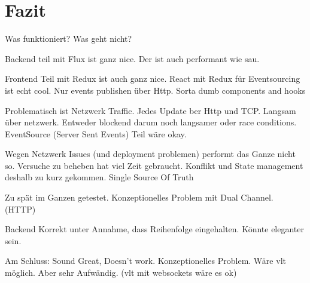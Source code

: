 \section{Fazit}

Was funktioniert?
Was geht nicht?


Backend teil mit Flux ist ganz nice.
Der ist auch performant wie sau.

Frontend Teil mit Redux ist auch ganz nice.
React mit Redux für Eventsourcing ist echt cool.
Nur events publishen über Http.
Sorta dumb components and hooks

Problematisch ist Netzwerk Traffic.
Jedes Update ber Http und TCP.
Langsam über netzwerk.
Entweder blockend darum noch langsamer oder race conditions.
EventSource (Server Sent Events) Teil wäre okay.

Wegen Netzwerk Issues (und deployment problemen) performt das Ganze nicht so.
Versuche zu beheben hat viel Zeit gebraucht.
Konflikt und State management deshalb zu kurz gekommen.
Single Source Of Truth

Zu spät im Ganzen getestet.
Konzeptionelles Problem mit Dual Channel. (HTTP)

Backend Korrekt unter Annahme, dass Reihenfolge eingehalten.
Könnte eleganter sein.

Am Schluss: Sound Great, Doesn't work.
Konzeptionelles Problem. Wäre vlt möglich. Aber sehr Aufwändig. (vlt mit websockets wäre es ok)
